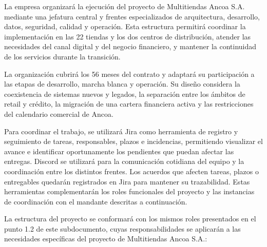 \documentclass[11pt]{article}
\begin{document}
La empresa organizará la ejecución del proyecto de Multitiendas Ancoa S.A. mediante una jefatura central y frentes especializados de arquitectura, desarrollo, datos, seguridad, calidad y operación. Esta estructura permitirá coordinar la implementación en las 22 tiendas y los dos centros de distribución, atender las necesidades del canal digital y del negocio financiero, y mantener la continuidad de los servicios durante la transición.

La organización cubrirá los 56 meses del contrato y adaptará su participación a las etapas de desarrollo, marcha blanca y operación. Su diseño considera la coexistencia de sistemas nuevos y legados, la separación entre los ámbitos de retail y crédito, la migración de una cartera financiera activa y las restricciones del calendario comercial de Ancoa.

Para coordinar el trabajo, se utilizará Jira como herramienta de registro y seguimiento de tareas, responsables, plazos e incidencias, permitiendo visualizar el avance e identificar oportunamente los pendientes que puedan afectar las entregas. Discord se utilizará para la comunicación cotidiana del equipo y la coordinación entre los distintos frentes. Los acuerdos que afecten tareas, plazos o entregables quedarán registrados en Jira para mantener su trazabilidad. Estas herramientas complementarán los roles funcionales del proyecto y las instancias de coordinación con el mandante descritas a continuación.

La estructura del proyecto se conformará con los mismos roles presentados en el punto 1.2 de este subdocumento, cuyas responsabilidades se aplicarán a las necesidades específicas del proyecto de Multitiendas Ancoa S.A.:
\end{document}

